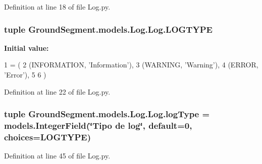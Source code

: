 Definition at line 18 of file Log.\+py.

\hypertarget{class_ground_segment_1_1models_1_1_log_1_1_log_ab1692e268594b524bb18dd71c2542ea1}{}
\subsubsection[{L\+O\+G\+T\+Y\+P\+E}]{\setlength{\rightskip}{0pt plus 5cm}tuple Ground\+Segment.\+models.\+Log.\+Log.\+L\+O\+G\+T\+Y\+P\+E\hspace{0.3cm}{\ttfamily [static]}}\label{class_ground_segment_1_1models_1_1_log_1_1_log_ab1692e268594b524bb18dd71c2542ea1}
{\bfseries Initial value\+:}
\begin{DoxyCode}
1 = (
2         (INFORMATION, \textcolor{stringliteral}{'Information'}),
3         (WARNING, \textcolor{stringliteral}{'Warning'}),
4         (ERROR, \textcolor{stringliteral}{'Error'}),
5         
6     )
\end{DoxyCode}


Definition at line 22 of file Log.\+py.

\hypertarget{class_ground_segment_1_1models_1_1_log_1_1_log_a71704dacd9c83ffc71076bb1e05293fd}{}
\subsubsection[{log\+Type}]{\setlength{\rightskip}{0pt plus 5cm}tuple Ground\+Segment.\+models.\+Log.\+Log.\+log\+Type = models.\+Integer\+Field(\char`\"{}Tipo de log\char`\"{}, default=0, choices={\bf L\+O\+G\+T\+Y\+P\+E})\hspace{0.3cm}{\ttfamily [static]}}\label{class_ground_segment_1_1models_1_1_log_1_1_log_a71704dacd9c83ffc71076bb1e05293fd}


Definition at line 45 of file Log.\+py.

\hypertarget{class_ground_segment_1_1models_1_1_log_1_1_log_a641912d76965a5802c808ca609194bf2}{}

